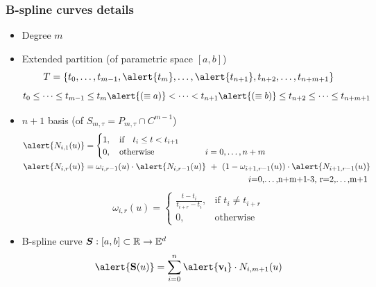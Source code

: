 \begin{frame}
  \frametitle{B-spline curves details}
  \begin{itemize}
  \item Degree \alert{$m$}\pause
  \item Extended \alert{partition} (of parametric
    space \alert{$[a,b]$})
    $$
    T=\{t_0,\dots,t_{m-1},\alert{t_{m}},\dots,\alert{t_{n+1}},t_{n+2},\dots,t_{n+m+1}\}
    $$
    {\tiny
      $$
      t_0\leq\dots\leq t_{m-1}\leq t_{m}\alert{(\equiv a)} <\dots<
      t_{n+1}\alert{(\equiv b)} \leq t_{n+2}\leq\dots\leq t_{n+m+1}
      $$
    }\pause
  \item \alert{$n+1$ basis} (of $S_{m,\tau}=P_{m,\tau}\cap C^{m-1}$)
    {\tiny
      \begin{align*}
        \alert{N_{i,1}(u)} &=
                     \begin{cases}
                       1,\quad \mbox{if}\quad t_i\leq t<t_{i+1}\\
                       0,\quad \mbox{otherwise}\qquad\qquad\qquad i=0,\dots,n+m
                     \end{cases}\\
        \alert{N_{i,r}(u)} &= \omega_{i,r-1}(u)\cdot \alert{N_{i,r-1}(u)}\ +\
                     (1-\omega_{i+1,r-1}(u))\cdot \alert{N_{i+1,r-1}(u)}\\
                   &\pushright i=0,\dots,n+m+1-3,\ r=2,\dots,m+1
      \end{align*}
    }
    {\tiny
      $$
      \omega_{i,r}(u) = \begin{cases}
        \frac{t-t_i}{t_{i+r}-t_i},&\mbox{if }t_i\neq t_{i+r}\\
        0, &\mbox{otherwise}
      \end{cases}
      $$
    }\pause
  \item B-spline curve $\boldsymbol{S}:[a,b]\subset\mathbb{R}\rightarrow\mathbb{E}^d$
    $$
    \alert{\mathbf{S}(u)}=\sum_{i=0}^n\alert{\mathbf{v_i}}\cdot N_{i,m+1}(u)
    $$
  \end{itemize}
\end{frame}

